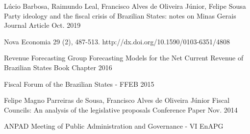 \begin{cventries}

  \cventry
    {Lúcio Barbosa, Raimundo Leal, Francisco Alves de Oliveira Júnior, Felipe Sousa}
    {Party ideology and the fiscal crisis of Brazilian States: notes on Minas Gerais}
    {Journal Article}
    {Oct. 2019}
    {
      \begin{cvitems}
        \item {Nova Economia 29 (2), 487-513. http://dx.doi.org/10.1590/0103-6351/4808}
      \end{cvitems}
    }

  \cventry
    {Revenue Forecasting Group}
    {Forecasting Models for the Net Current Revenue of Brazilian States}
    {Book Chapter}
    {2016}
    {
      \begin{cvitems}
        \item {Fiscal Forum of the Brazilian States - FFEB 2015}
      \end{cvitems}
    }

  \cventry
    {Felipe Magno Parreiras de Sousa, Francisco Alves de Oliveira Júnior} 
    {Fiscal Councils: An analysis of the legislative proposals}
    {Conference Paper}
    {Nov. 2014}
    {
      \begin{cvitems}
        \item {ANPAD Meeting of Public Administration and Governance - VI EnAPG}
      \end{cvitems}
    }

\end{cventries}